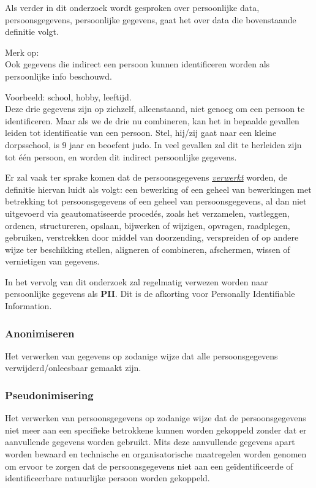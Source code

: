  Als verder in dit onderzoek wordt gesproken over persoonlijke data, persoonsgegevens, persoonlijke gegevens, gaat het over data die bovenstaande definitie volgt.
 
  Merk op:
  \\ Ook gegevens die indirect een persoon kunnen identificeren worden als persoonlijke info beschouwd. 
 
 Voorbeeld: school, hobby, leeftijd.
 \\ Deze drie gegevens zijn op zichzelf, alleenstaand, niet genoeg om een persoon te identificeren.
 Maar als we de drie nu combineren, kan het in bepaalde gevallen leiden tot identificatie van een persoon. Stel, hij/zij gaat naar een kleine dorpsschool, is 9 jaar en beoefent judo. In veel gevallen zal dit te herleiden zijn tot één persoon, en worden dit indirect persoonlijke gegevens. 

Er zal vaak ter sprake komen dat de persoonsgegevens \underline{\textit{verwerkt}} worden, de definitie hiervan luidt als volgt: een bewerking of een geheel van bewerkingen met betrekking tot persoonsgegevens of een geheel van persoonsgegevens, al dan niet uitgevoerd via geautomatiseerde procedés, zoals het verzamelen, vastleggen, ordenen, structureren, opslaan, bijwerken of wijzigen, opvragen, raadplegen, gebruiken, verstrekken door middel van doorzending, verspreiden of op andere wijze ter beschikking stellen, aligneren of combineren, afschermen, wissen of vernietigen van gegevens.

In het vervolg van dit onderzoek zal regelmatig verwezen worden naar persoonlijke gegevens als \textbf{PII}. Dit is de afkorting voor Personally Identifiable Information.

\subsubsection{Anonimiseren}
Het verwerken van gegevens op zodanige wijze dat alle persoonsgegevens verwijderd/onleesbaar gemaakt zijn. 

\subsubsection{Pseudonimisering} 
Het verwerken van persoonsgegevens op zodanige wijze dat de persoonsgegevens niet meer aan een specifieke betrokkene kunnen worden gekoppeld zonder dat er aanvullende gegevens worden gebruikt. Mits deze aanvullende gegevens apart worden bewaard en technische en organisatorische maatregelen worden genomen om ervoor te zorgen dat de persoonsgegevens niet aan een geïdentificeerde of identificeerbare natuurlijke persoon worden gekoppeld. 

